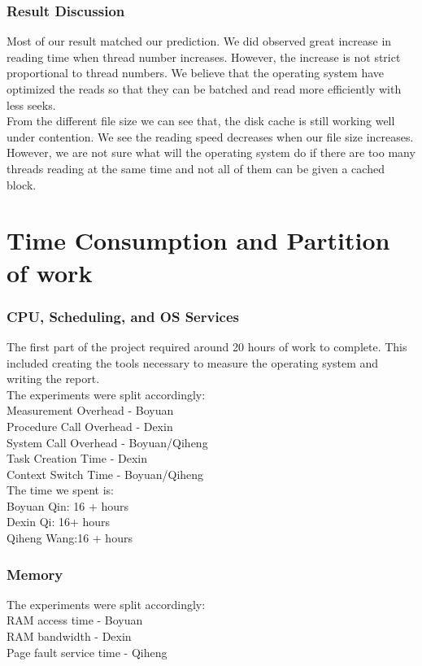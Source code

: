 \documentclass{article} %
\begin{document}
\subsubsection{Result Discussion}
Most of our result matched our prediction. We did observed great increase in reading time when thread number increases. However, the increase is not strict proportional to thread numbers. We believe that the operating system have optimized the reads so that they can be batched and read more efficiently with less seeks. \\
From the different file size we can see that, the disk cache is still working well under contention. We see the reading speed decreases when our file size increases. However, we are not sure what will the operating system do if there are too many threads reading at the same time and not all of them can be given a cached block. \\

\section{Time Consumption and Partition of work}
\subsubsection{CPU, Scheduling, and OS Services}
The first part of the project required around 20 hours of work to complete. This included creating the tools necessary to measure the operating system and writing the report.\\
The experiments were split accordingly:\\
Measurement Overhead - Boyuan\\
Procedure Call Overhead - Dexin\\
System Call Overhead - Boyuan/Qiheng\\
Task Creation Time - Dexin\\
Context Switch Time - Boyuan/Qiheng\\

The time we spent is:\\
Boyuan Qin: 16 + hours\\
Dexin Qi: 16+ hours\\
Qiheng Wang:16 + hours

\subsubsection{Memory}
The experiments were split accordingly:\\
RAM access time - Boyuan\\
RAM bandwidth - Dexin\\
Page fault service time - Qiheng\\
\end{document}
